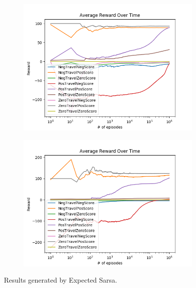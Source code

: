 \documentclass[result.tex]{subfiles}
\begin{document}
\begin{figure}[ht]
        \begin{subfigure}[b]{.35\linewidth}
            \includegraphics[width=\linewidth]{../images/expected_sarsa/reward/234/board_state_average_reward_over_time.png}
        \end{subfigure}
        \begin{subfigure}[b]{.35\linewidth}
            \includegraphics[width=\linewidth]{../images/expected_sarsa/reward/234/directional_distance_state_average_reward_over_time.png}
        \end{subfigure}
        \caption{Results generated by Expected Sarsa.}
        \label{fig:reward_result_expected_sarsa}
    \end{figure}
\end{document}

